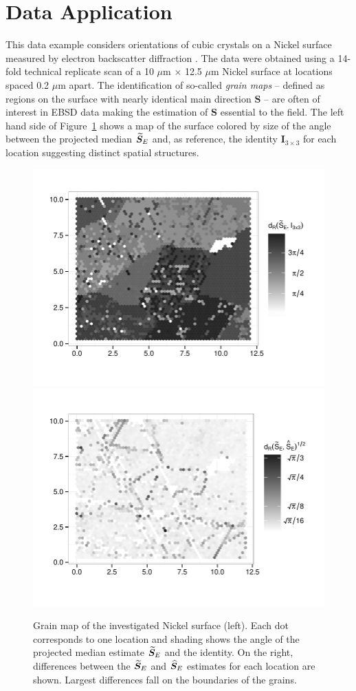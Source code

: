 \section{Data Application}\label{sec:data}

This data example considers orientations of cubic crystals on a Nickel surface measured by electron backscatter diffraction \citep{bingham10b}. The data were obtained using a 14-fold technical replicate scan of a 10 $\mu$m $\times$ 12.5 $\mu$m Nickel surface at locations spaced 0.2 $\mu$m apart.
The identification of so-called {\it grain maps} -- defined as regions on the surface with nearly identical main direction $\bm S$ -- are often of interest in EBSD data making the estimation of $\bm S$ essential to the field. 
The left hand side of Figure~\ref{fig:grain-map} shows a map of the surface colored by size of the angle between the projected median ${\widetilde{\bm S}_E}$ and, as reference, the identity $\bm I_{3\times 3}$ for each location suggesting  distinct spatial structures.
\begin{figure}[htbp] %
   \centering
   \includegraphics[width=.49\textwidth]{images/grain-map.pdf} 
   \includegraphics[width=.49\textwidth]{images/grain-diff.pdf} 
   \caption{ \label{fig:grain-map}Grain map of the investigated Nickel surface (left). Each dot corresponds to one location and shading shows the angle of the projected median estimate ${\widetilde{\bm S}_E}$ and the identity. On the right, differences between the ${\widetilde{\bm S}_E}$ and ${\widehat{\bm S}_E}$ estimates for each location are shown. Largest differences fall on the boundaries of the grains.}
\end{figure}
